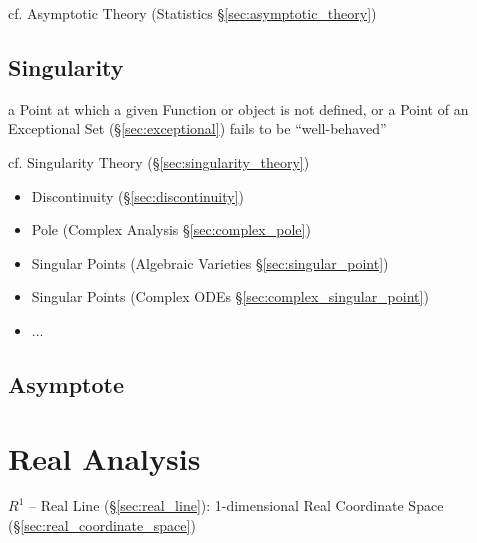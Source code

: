 \fist cf. Asymptotic Theory (Statistics \S\ref{sec:asymptotic_theory})



\subsection{Singularity}\label{sec:singularity}


a Point at which a given Function or object is not defined, or a Point of an
Exceptional Set (\S\ref{sec:exceptional}) fails to be ``well-behaved''

\fist cf. Singularity Theory (\S\ref{sec:singularity_theory})

\begin{itemize}
  \item Discontinuity (\S\ref{sec:discontinuity})
  \item Pole (Complex Analysis \S\ref{sec:complex_pole})
  \item Singular Points (Algebraic Varieties \S\ref{sec:singular_point})
  \item Singular Points (Complex ODEs \S\ref{sec:complex_singular_point})
  \item ...
\end{itemize}



\subsection{Asymptote}\label{sec:asymptote}



\section{Real Analysis}\label{sec:real_analysis}

$R^1$ -- Real Line (\S\ref{sec:real_line}): 1-dimensional Real
Coordinate Space (\S\ref{sec:real_coordinate_space})

